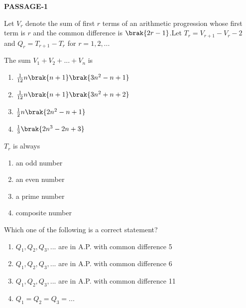 \iffalse
  \title{Assignment-1}
  \author{EE24BTECH11016 - DHWANITH M DODDAHUNDI}
  \section{paragraph}
\fi
\item[]
\begin{center}    
   \textbf{PASSAGE-1}
    \end{center}
 Let $ V_{r} $ denote the sum of first $r$ terms of an arithmetic progression  whose first term is $r$ and the common difference is $\brak{2r-1}$.Let $ T_{r}=V_{r+1}-V_{r}-2 $ and $ Q_{r}=T_{r+1}-T_{r}$ for $r=1,2,...$
 \\ 
 

 \item The sum  $  V_{1}+V_{2}+...+V_{n} $  is 
 
	 \hfill {}                            
     \begin{enumerate}
         
	     \item $\frac{1}{12}n\brak{n+1}\brak{3n^{2}-n+1}$
	     \item $\frac{1}{12}n\brak{n+1}\brak{3n^{2}+n+2}$
	     \item $\frac{1}{2}n\brak{2n^{2}-n+1}$
	     \item $\frac{1}{3}\brak{2n^{3}-2n+3}$
    \end{enumerate} 

  \item $T_{r}$ is always 
                           
	  \hfill {}                    
                  \begin{multicols}{2}      
                        \begin{enumerate} 
	
       \item an odd number 
       \item an even number
	\item a prime number 
        \item composite number

	  \end{enumerate}
   \end{multicols}
    \item Which one of the following is a correct statement? 
          
	    \hfill {}                                  
     \begin{enumerate}
	\item $Q_{1},Q_{2},Q_{3},...$ are in A.P. with common difference 5 
	\item $Q_{1},Q_{2},Q_{3},...$ are in A.P. with common difference 6
	\item $Q_{1},Q_{2},Q_{3},...$ are in A.P. with common difference 11
	\item $Q_{1}=Q_{2}=Q_{3}=...$
	\end{enumerate}
       
